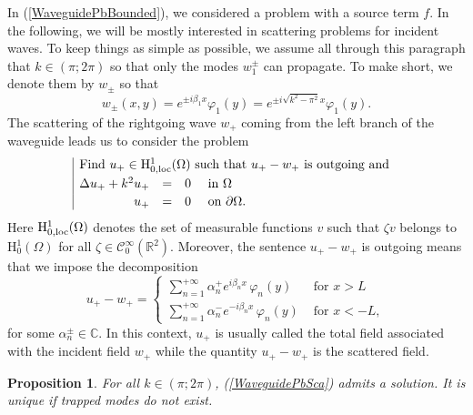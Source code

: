 \documentclass[11pt,a4paper]{report}
\newcommand{\dsp}{\displaystyle}
\newcommand{\Om}{\Omega}
\newcommand{\mrm}[1]{\mathrm{#1}}
\newcommand{\Cplx}{\mathbb{C}}
\newcommand{\R}{\mathbb{R}}
\newcommand{\mH}{\mrm{H}}
\newcommand{\loc}{\mbox{\scriptsize loc}}
\newtheorem{proposition}[theorem]{Proposition}
\begin{document}
In (\ref{WaveguidePbBounded}), we considered a problem with a source term $f$. In the following, we will be mostly interested in scattering problems for incident waves. To keep things as simple as possible, we assume all through this paragraph that $k\in(\pi;2\pi)$ so that only the modes $w^\pm_1$ can propagate. To make short, we denote them by $w_\pm$ so that
\begin{equation}\label{Defwpm}
w_\pm(x,y)=e^{\pm i\beta_1 x}\varphi_1(y)=e^{\pm i\sqrt{k^2-\pi^2} x}\varphi_1(y).
\end{equation}
The scattering of the rightgoing wave $w_+$ coming from the left branch of the waveguide leads us to consider the problem
\begin{equation}\label{WaveguidePbSca}
\begin{array}{|rcll}
\multicolumn{4}{|l}{\mbox{Find }u_+\in\mH^1_{0,\loc}(\Om)\mbox{ such that }u_+-w_+\mbox{ is outgoing and } }\\[3pt]
\Delta u_++k^2u_+&=&0&\mbox{ in }\Om \\[2pt]
u_+&=&0&\mbox{ on }\partial\Om.
\end{array}
\end{equation}
Here $\mH^1_{0,\loc}(\Om)$ denotes the set of measurable functions $v$ such that $\zeta v$ belongs to $\mH^1_0(\Om)$ for all $\zeta\in\mathscr{C}^{\infty}_0(\R^2)$. Moreover, the sentence $u_+-w_+$ is outgoing means that we impose the decomposition
\[
u_+-w_+=\left\{\begin{array}{ll}
\dsp\sum_{n=1}^{+\infty} \alpha^+_ne^{ i\beta_n x}\,\varphi_n(y) & \mbox{ for }x>L\\[10pt]
\dsp\sum_{n=1}^{+\infty} \alpha^-_ne^{-i\beta_n x}\,\varphi_n(y) & \mbox{ for } x<-L,
\end{array}\right.
\]
for some $\alpha^\pm_n\in\Cplx$. In this context, $u_+$ is usually called the total field associated with the incident field $w_+$ while the quantity $u_+-w_+$ is the scattered field. 
\begin{proposition}\label{PropoWPDirichletSca}
For all $k\in(\pi;2\pi)$, (\ref{WaveguidePbSca}) admits a solution. It is unique if trapped modes do not exist.
\end{proposition}
\end{document}
